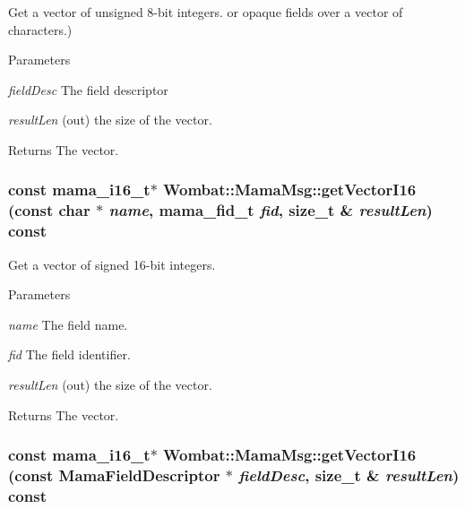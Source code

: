Get a vector of unsigned 8-\/bit integers. or opaque fields over a vector of characters.) 
\begin{DoxyParams}{Parameters}
\item[{\em fieldDesc}]The field descriptor \item[{\em resultLen}](out) the size of the vector. \end{DoxyParams}
\begin{DoxyReturn}{Returns}
The vector. 
\end{DoxyReturn}
\hypertarget{classWombat_1_1MamaMsg_a2c97bdf7d33d0306b7392eb33dad6109}{
\subsubsection[{getVectorI16}]{\setlength{\rightskip}{0pt plus 5cm}const mama\_\-i16\_\-t$\ast$ Wombat::MamaMsg::getVectorI16 (const char $\ast$ {\em name}, \/  mama\_\-fid\_\-t {\em fid}, \/  size\_\-t \& {\em resultLen}) const}}
\label{classWombat_1_1MamaMsg_a2c97bdf7d33d0306b7392eb33dad6109}


Get a vector of signed 16-\/bit integers. 
\begin{DoxyParams}{Parameters}
\item[{\em name}]The field name. \item[{\em fid}]The field identifier. \item[{\em resultLen}](out) the size of the vector. \end{DoxyParams}
\begin{DoxyReturn}{Returns}
The vector. 
\end{DoxyReturn}
\hypertarget{classWombat_1_1MamaMsg_aaa1aa5dd44c7ff6594e3b77c7277fb23}{
\subsubsection[{getVectorI16}]{\setlength{\rightskip}{0pt plus 5cm}const mama\_\-i16\_\-t$\ast$ Wombat::MamaMsg::getVectorI16 (const {\bf MamaFieldDescriptor} $\ast$ {\em fieldDesc}, \/  size\_\-t \& {\em resultLen}) const}}
\label{classWombat_1_1MamaMsg_aaa1aa5dd44c7ff6594e3b77c7277fb23}


